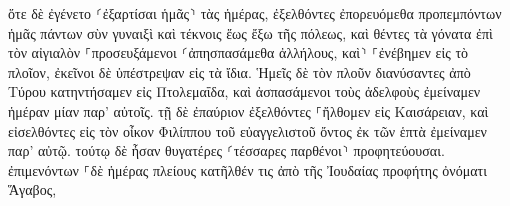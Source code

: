 \documentclass{openreader}
\begin{document}
ὅτε δὲ ἐγένετο ⸂ἐξαρτίσαι ἡμᾶς⸃ τὰς ἡμέρας, ἐξελθόντες ἐπορευόμεθα προπεμπόντων ἡμᾶς πάντων σὺν γυναιξὶ καὶ τέκνοις ἕως ἔξω τῆς πόλεως, καὶ θέντες τὰ γόνατα ἐπὶ τὸν αἰγιαλὸν ⸀προσευξάμενοι 
⸂ἀπησπασάμεθα ἀλλήλους, καὶ⸃ ⸀ἐνέβημεν εἰς τὸ πλοῖον, ἐκεῖνοι δὲ ὑπέστρεψαν εἰς τὰ ἴδια. 
Ἡμεῖς δὲ τὸν πλοῦν διανύσαντες ἀπὸ Τύρου κατηντήσαμεν εἰς Πτολεμαΐδα, καὶ ἀσπασάμενοι τοὺς ἀδελφοὺς ἐμείναμεν ἡμέραν μίαν παρ’ αὐτοῖς. 
τῇ δὲ ἐπαύριον ἐξελθόντες ⸀ἤλθομεν εἰς Καισάρειαν, καὶ εἰσελθόντες εἰς τὸν οἶκον Φιλίππου τοῦ εὐαγγελιστοῦ ὄντος ἐκ τῶν ἑπτὰ ἐμείναμεν παρ’ αὐτῷ. 
τούτῳ δὲ ἦσαν θυγατέρες ⸂τέσσαρες παρθένοι⸃ προφητεύουσαι. 
ἐπιμενόντων ⸀δὲ ἡμέρας πλείους κατῆλθέν τις ἀπὸ τῆς Ἰουδαίας προφήτης ὀνόματι Ἅγαβος, 
\end{document}
